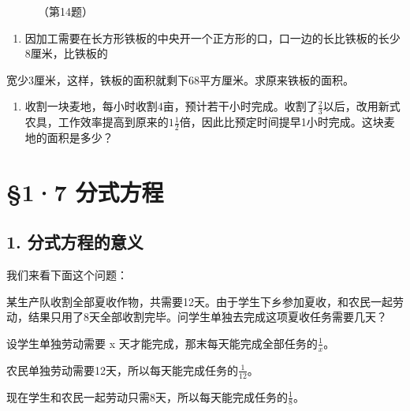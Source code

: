 \begin{figure}
\centering
\caption{（第14题）}
\end{figure}

\begin{enumerate}[start=14]
\item
  因加工需要在长方形铁板的中央开一个正方形的口，口一边的长比铁板的长少8厘米，比铁板的
\end{enumerate}

宽少3厘米，这样，铁板的面积就剩下68平方厘米。求原来铁板的面积。

\begin{enumerate}[start=15]
\item
  收割一块麦地，每小时收割4亩，预计若干小时完成。收割了\(\frac{2}{3}\)以后，改用新式农具，工作效率提高到原来的\(1\frac{1}{2}\)倍，因此比预定时间提早1小时完成。这块麦地的面积是多少？
\end{enumerate}

\section{§1·7 分式方程}

\subsection{1. 分式方程的意义}

我们来看下面这个问题：

某生产队收割全部夏收作物，共需要12天。由于学生下乡参加夏收，和农民一起劳动，结果只用了8天全部收割完毕。问学生单独去完成这项夏收任务需要几天？

设学生单独劳动需要 x
天才能完成，那末每天能完成全部任务的\(\frac{1}{x}\)。

农民单独劳动需要12天，所以每天能完成任务的\(\frac{1}{12}\)。

现在学生和农民一起劳动只需8天，所以每天能完成任务的\(\frac{1}{8}\)。


